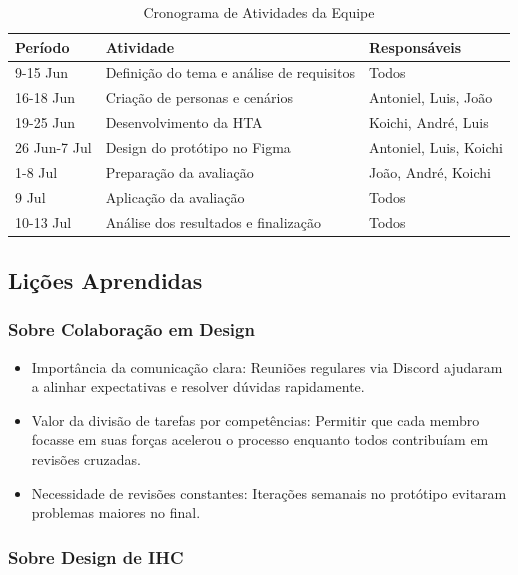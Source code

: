 \documentclass[12pt, a4paper]{report}
\begin{document}
\begin{table}[H]
\centering
\begin{tabular}{|l|l|l|}
\hline
\textbf{Período} & \textbf{Atividade} & \textbf{Responsáveis} \\
\hline
9-15 Jun & Definição do tema e análise de requisitos & Todos \\
\hline
16-18 Jun & Criação de personas e cenários & Antoniel, Luis, João \\
\hline
19-25 Jun & Desenvolvimento da HTA & Koichi, André, Luis \\
\hline
26 Jun-7 Jul & Design do protótipo no Figma & Antoniel, Luis, Koichi \\
\hline
1-8 Jul & Preparação da avaliação & João, André, Koichi \\
\hline
9 Jul & Aplicação da avaliação & Todos \\
\hline
10-13 Jul & Análise dos resultados e finalização & Todos \\
\hline
\end{tabular}
\caption{Cronograma de Atividades da Equipe}
\label{tab:cronograma}
\end{table}

\subsection{Lições Aprendidas}

\subsubsection{Sobre Colaboração em Design}

\begin{itemize}
    \item Importância da comunicação clara: Reuniões regulares via Discord ajudaram a alinhar expectativas e resolver dúvidas rapidamente.
    \item Valor da divisão de tarefas por competências: Permitir que cada membro focasse em suas forças acelerou o processo enquanto todos contribuíam em revisões cruzadas.
    \item Necessidade de revisões constantes: Iterações semanais no protótipo evitaram problemas maiores no final.
\end{itemize}

\subsubsection{Sobre Design de IHC}
\end{document}
